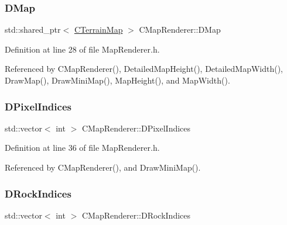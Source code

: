 \hypertarget{classCMapRenderer_ab9a199c61aa1c87a3248af3085d8ba52}{}\label{classCMapRenderer_ab9a199c61aa1c87a3248af3085d8ba52} 
\subsubsection{\texorpdfstring{D\+Map}{DMap}}
{\footnotesize\ttfamily std\+::shared\+\_\+ptr$<$ \hyperlink{classCTerrainMap}{C\+Terrain\+Map} $>$ C\+Map\+Renderer\+::\+D\+Map\hspace{0.3cm}{\ttfamily [protected]}}



Definition at line 28 of file Map\+Renderer.\+h.



Referenced by C\+Map\+Renderer(), Detailed\+Map\+Height(), Detailed\+Map\+Width(), Draw\+Map(), Draw\+Mini\+Map(), Map\+Height(), and Map\+Width().

\hypertarget{classCMapRenderer_af636936c20248c3ee6cb6ec46f18f077}{}\label{classCMapRenderer_af636936c20248c3ee6cb6ec46f18f077} 
\subsubsection{\texorpdfstring{D\+Pixel\+Indices}{DPixelIndices}}
{\footnotesize\ttfamily std\+::vector$<$ int $>$ C\+Map\+Renderer\+::\+D\+Pixel\+Indices\hspace{0.3cm}{\ttfamily [protected]}}



Definition at line 36 of file Map\+Renderer.\+h.



Referenced by C\+Map\+Renderer(), and Draw\+Mini\+Map().

\hypertarget{classCMapRenderer_ac9178a9c9d30ac44aed7d324c51164a4}{}\label{classCMapRenderer_ac9178a9c9d30ac44aed7d324c51164a4} 
\subsubsection{\texorpdfstring{D\+Rock\+Indices}{DRockIndices}}
{\footnotesize\ttfamily std\+::vector$<$ int $>$ C\+Map\+Renderer\+::\+D\+Rock\+Indices\hspace{0.3cm}{\ttfamily [protected]}}



